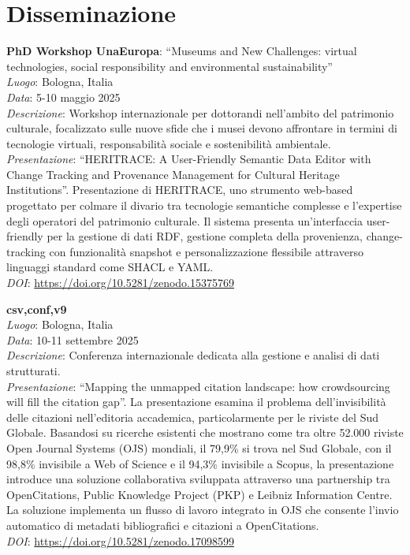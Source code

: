 \section{Disseminazione}

\textbf{PhD Workshop UnaEuropa}: ``Museums and New Challenges: virtual technologies, social responsibility and environmental sustainability''\\
\textit{Luogo}: Bologna, Italia\\
\textit{Data}: 5-10 maggio 2025\\
\textit{Descrizione}: Workshop internazionale per dottorandi nell'ambito del patrimonio culturale, focalizzato sulle nuove sfide che i musei devono affrontare in termini di tecnologie virtuali, responsabilità sociale e sostenibilità ambientale.\\
\textit{Presentazione}: ``HERITRACE: A User-Friendly Semantic Data Editor with Change Tracking and Provenance Management for Cultural Heritage Institutions''. Presentazione di HERITRACE, uno strumento web-based progettato per colmare il divario tra tecnologie semantiche complesse e l'expertise degli operatori del patrimonio culturale. Il sistema presenta un'interfaccia user-friendly per la gestione di dati RDF, gestione completa della provenienza, change-tracking con funzionalità snapshot e personalizzazione flessibile attraverso linguaggi standard come SHACL e YAML.\\
\textit{DOI}: \url{https://doi.org/10.5281/zenodo.15375769}

\vspace{0.5cm}

\textbf{csv,conf,v9}\\
\textit{Luogo}: Bologna, Italia\\
\textit{Data}: 10-11 settembre 2025\\
\textit{Descrizione}: Conferenza internazionale dedicata alla gestione e analisi di dati strutturati.\\
\textit{Presentazione}: ``Mapping the unmapped citation landscape: how crowdsourcing will fill the citation gap''. La presentazione esamina il problema dell'invisibilità delle citazioni nell'editoria accademica, particolarmente per le riviste del Sud Globale. Basandosi su ricerche esistenti che mostrano come tra oltre 52.000 riviste Open Journal Systems (OJS) mondiali, il 79,9\% si trova nel Sud Globale, con il 98,8\% invisibile a Web of Science e il 94,3\% invisibile a Scopus, la presentazione introduce una soluzione collaborativa sviluppata attraverso una partnership tra OpenCitations, Public Knowledge Project (PKP) e Leibniz Information Centre. La soluzione implementa un flusso di lavoro integrato in OJS che consente l'invio automatico di metadati bibliografici e citazioni a OpenCitations.\\
\textit{DOI}: \url{https://doi.org/10.5281/zenodo.17098599}